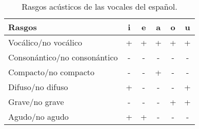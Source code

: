 \begin{table}[!ht]
	\centering\small
	\begin{tabular}{lccccc}
		\toprule
		Rasgos&i&e&a&o&u\\
		\midrule
		Vocálico/no vocálico&+&+&+&+&+\\
		Consonántico/no consonántico&-&-&-&-&-\\
		Compacto/no compacto&-&-&+&-&-\\
		Difuso/no difuso&+&-&-&-&+\\
		Grave/no grave&-&-&-&+&+\\
		Agudo/no agudo&+&+&-&-&-\\
		\bottomrule
	\end{tabular}
	\caption{Rasgos acústicos de las vocales del español.}
	\label{tab:vocales-acusticas}
\end{table}


